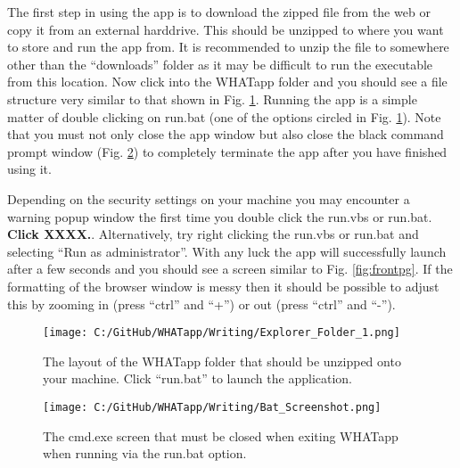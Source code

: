 \documentclass[11pt]{article}
\begin{document}
The first step in using the app is to download the zipped file from the web or copy it from an external harddrive. This should be unzipped to where you want to store and run the app from. It is recommended to unzip the file to somewhere other than the ``downloads'' folder as it may be difficult to run the executable from this location. Now click into the WHATapp folder and you should see a file structure very similar to that shown in Fig. \ref{fig:expl1screen}. Running the app is a simple matter of double clicking on run.bat (one of the options circled in Fig. \ref{fig:expl1screen}). Note that you must not only close the app window but also close the black command prompt window (Fig. \ref{fig:batscreen}) to completely terminate the app after you have finished using it.


Depending on the security settings on your machine you may encounter a warning popup window the first time you double click the run.vbs or run.bat. {\bf Click XXXX.}. Alternatively, try right clicking the run.vbs or run.bat and selecting ``Run as administrator''. With any luck the app will successfully launch after a few seconds and you should see a screen similar to Fig. \ref{fig:frontpg}. If the formatting of the browser window is messy then it should be possible to adjust this by zooming in (press ``ctrl'' and ``+'') or out (press ``ctrl'' and ``-'').

 \begin{figure} [h]
  \centering
\texttt{[image: C:/GitHub/WHATapp/Writing/Explorer\_Folder\_1.png]}
  \caption {The layout of the WHATapp folder that should be unzipped onto your machine. Click ``run.bat'' to launch the application.}
  \label{fig:expl1screen}
\end{figure}


 \begin{figure} [h]
  \centering
\texttt{[image: C:/GitHub/WHATapp/Writing/Bat\_Screenshot.png]}
  \caption {The cmd.exe screen that must be closed when exiting WHATapp when running via the run.bat option.}
  \label{fig:batscreen}
\end{figure}
\end{document}
